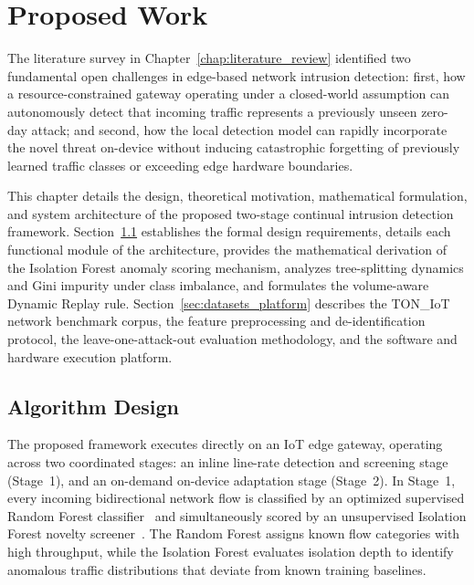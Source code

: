 \chapter{Proposed Work}
\label{chap:proposed_work}
\label{chap:proposed_framework}
\label{chap:system_model}

The literature survey in Chapter~\ref{chap:literature_review} identified two fundamental open challenges in edge-based network intrusion detection: first, how a resource-constrained gateway operating under a closed-world assumption can autonomously detect that incoming traffic represents a previously unseen zero-day attack; and second, how the local detection model can rapidly incorporate the novel threat on-device without inducing catastrophic forgetting of previously learned traffic classes or exceeding edge hardware boundaries.

This chapter details the design, theoretical motivation, mathematical formulation, and system architecture of the proposed two-stage continual intrusion detection framework. Section~\ref{sec:algorithm_design} establishes the formal design requirements, details each functional module of the architecture, provides the mathematical derivation of the Isolation Forest anomaly scoring mechanism, analyzes tree-splitting dynamics and Gini impurity under class imbalance, and formulates the volume-aware Dynamic Replay rule. Section~\ref{sec:datasets_platform} describes the TON\_IoT network benchmark corpus, the feature preprocessing and de-identification protocol, the leave-one-attack-out evaluation methodology, and the software and hardware execution platform.

\section{Algorithm Design}
\label{sec:algorithm_design}

The proposed framework executes directly on an IoT edge gateway, operating across two coordinated stages: an inline line-rate detection and screening stage (Stage~1), and an on-demand on-device adaptation stage (Stage~2). In Stage~1, every incoming bidirectional network flow is classified by an optimized supervised Random Forest classifier~\cite{breiman2001random} and simultaneously scored by an unsupervised Isolation Forest novelty screener~\cite{liu2008isolation}. The Random Forest assigns known flow categories with high throughput, while the Isolation Forest evaluates isolation depth to identify anomalous traffic distributions that deviate from known training baselines.

